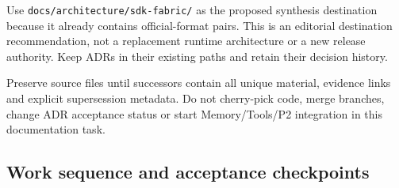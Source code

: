 \documentclass[
  11pt,
]{article}
\begin{document}
Use \nolinkurl{docs/architecture/sdk-fabric/} as the proposed synthesis
destination because it already contains official-format pairs. This is
an editorial destination recommendation, not a replacement runtime
architecture or a new release authority. Keep ADRs in their existing
paths and retain their decision history.

Preserve source files until successors contain all unique material,
evidence links and explicit supersession metadata. Do not cherry-pick
code, merge branches, change ADR acceptance status or start
Memory/Tools/P2 integration in this documentation task.

\hypertarget{work-sequence-and-acceptance-checkpoints}{%
\subsection{Work sequence and acceptance
checkpoints}\label{work-sequence-and-acceptance-checkpoints}}
\end{document}
